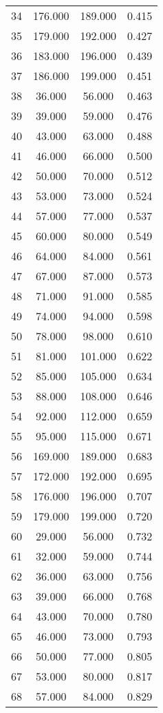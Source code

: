 \begin{tabular}{cccc}
  34 & 176.000 & 189.000 & 0.415 \\ 
  35 & 179.000 & 192.000 & 0.427 \\ 
  36 & 183.000 & 196.000 & 0.439 \\ 
  37 & 186.000 & 199.000 & 0.451 \\ 
  38 & 36.000 & 56.000 & 0.463 \\ 
  39 & 39.000 & 59.000 & 0.476 \\ 
  40 & 43.000 & 63.000 & 0.488 \\ 
  41 & 46.000 & 66.000 & 0.500 \\ 
  42 & 50.000 & 70.000 & 0.512 \\ 
  43 & 53.000 & 73.000 & 0.524 \\ 
  44 & 57.000 & 77.000 & 0.537 \\ 
  45 & 60.000 & 80.000 & 0.549 \\ 
  46 & 64.000 & 84.000 & 0.561 \\ 
  47 & 67.000 & 87.000 & 0.573 \\ 
  48 & 71.000 & 91.000 & 0.585 \\ 
  49 & 74.000 & 94.000 & 0.598 \\ 
  50 & 78.000 & 98.000 & 0.610 \\ 
  51 & 81.000 & 101.000 & 0.622 \\ 
  52 & 85.000 & 105.000 & 0.634 \\ 
  53 & 88.000 & 108.000 & 0.646 \\ 
  54 & 92.000 & 112.000 & 0.659 \\ 
  55 & 95.000 & 115.000 & 0.671 \\ 
  56 & 169.000 & 189.000 & 0.683 \\ 
  57 & 172.000 & 192.000 & 0.695 \\ 
  58 & 176.000 & 196.000 & 0.707 \\ 
  59 & 179.000 & 199.000 & 0.720 \\ 
  60 & 29.000 & 56.000 & 0.732 \\ 
  61 & 32.000 & 59.000 & 0.744 \\ 
  62 & 36.000 & 63.000 & 0.756 \\ 
  63 & 39.000 & 66.000 & 0.768 \\ 
  64 & 43.000 & 70.000 & 0.780 \\ 
  65 & 46.000 & 73.000 & 0.793 \\ 
  66 & 50.000 & 77.000 & 0.805 \\ 
  67 & 53.000 & 80.000 & 0.817 \\ 
  68 & 57.000 & 84.000 & 0.829 \\ 

\end{tabular}
